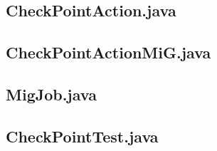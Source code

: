 \begin{landscape}
\subsection{CheckPointAction.java}\label{checkpointaction}

\subsection{CheckPointActionMiG.java}\label{checkpointactionmig}

\subsection{MigJob.java}\label{migjob}

\subsection{CheckPointTest.java}\label{checkpointtest}

\end{landscape}
